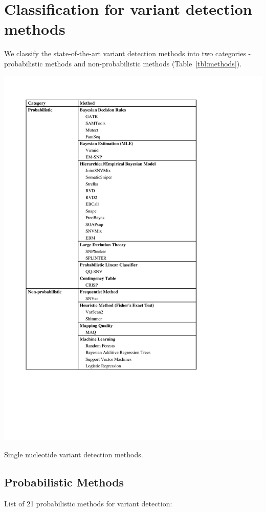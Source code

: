 \documentclass[11pt,reqno]{amsart}
\begin{document}
\section{Classification for variant detection methods}
We classify the state-of-the-art variant detection methods into two categories - probabilistic methods and non-probabilistic methods (Table~\ref{tbl:methods}).
\begin{table}[htbp]
\centering
\includegraphics[width=1.2\textwidth]{method_table.pdf}
\caption{Single nucleotide variant detection methods.}
\label{tbl:methods}
\end{table}


\subsection{Probabilistic Methods}
List of 21 probabilistic methods for variant detection:
\end{document}
